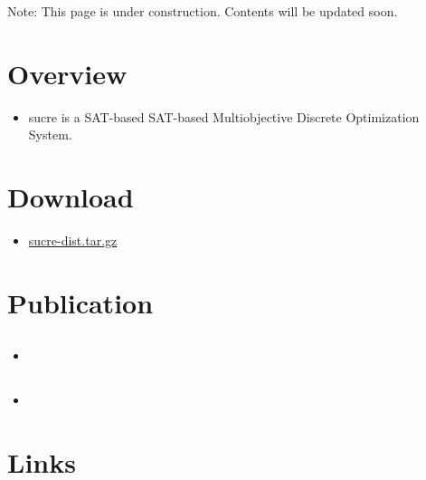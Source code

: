 \documentclass[11pt]{article}
\author{Takehide Soh}
\date{\today}
\title{}
\begin{document}
Note: This page is under construction. Contents will be updated soon.

\section*{Overview}
\label{sec:orgheadline1}
\begin{itemize}
\item sucre is a SAT-based SAT-based Multiobjective Discrete Optimization
System.
\end{itemize}

\section*{Download}
\label{sec:orgheadline2}
\begin{itemize}
\item \url{sucre-dist.tar.gz}
\end{itemize}

\section*{Publication}
\label{sec:orgheadline6}
\subsection*{}
\label{sec:orgheadline5}
\begin{itemize}
\item 
\label{sec:orgheadline3}
\item 
\label{sec:orgheadline4}
\end{itemize}


\section*{Links}
\label{sec:orgheadline7}
\end{document}
